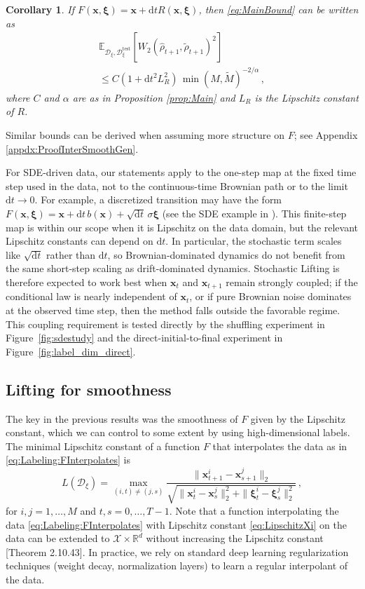 \documentclass{article}
\theoremstyle{plain}
\newtheorem{corollary}[theorem]{Corollary}
\theoremstyle{definition}
\theoremstyle{remark}
\newcommand{\bfxi}{{\bm \xi}}
\newcommand{\x}{\bm{x}}
\newcommand{\bR}{\mathbb{R}}
\newcommand{\rd}{\mathrm{d}}
\begin{document}
\begin{corollary}
  \label{corr:DTPlusL}
  If $F(\x, \bfxi) = \x + \rd t R(\x, \bfxi)$, then \eqref{eq:MainBound} can be written as
  \begin{multline}
    \mathbb E_{\mathcal{D}_{\xi}, \mathcal{D}_{\xi}^{\text{test}}} \left[ W_2( \hat{\rho}_{t + 1}, \tilde \rho_{t+1} )^2 \right] \\ \leq C ( 1 +  \rd t^2 L_R^2 ) \, {\min(M, \tilde M)}^{-2/\alpha}\,,
  \end{multline}
  where $C$ and $\alpha$ are as in Proposition \ref{prop:Main} and $L_R$ is the Lipschitz constant of $R$.
\end{corollary}
Similar bounds can be derived when assuming more structure on $F$; see Appendix \ref{appdx:ProofInterSmoothGen}.

For SDE-driven data, our statements apply to the one-step map at the fixed time step used in the data, not to the continuous-time Brownian path or to the limit $\rd t \to 0$. For example, a discretized transition may have the form $F(\x,\bfxi)=\x+\rd t\,b(\x)+\sqrt{\rd t}\,\sigma\bfxi$ (see the SDE example in ). This finite-step map is within our scope when it is Lipschitz on the data domain, but the relevant Lipschitz constants can depend on $\rd t$. In particular, the stochastic term scales like $\sqrt{\rd t}$ rather than $\rd t$, so Brownian-dominated dynamics do not benefit from the same short-step scaling as drift-dominated dynamics. Stochastic Lifting is therefore expected to work best when $\x_t$ and $\x_{t+1}$ remain strongly coupled; if the conditional law is nearly independent of $\x_t$, or if pure Brownian noise dominates at the observed time step, then the method falls outside the favorable regime. This coupling requirement is tested directly by the shuffling experiment in Figure~\ref{fig:sdestudy} and the direct-initial-to-final experiment in Figure~\ref{fig:label_dim_direct}. 

\subsection{Lifting for smoothness}
The key in the previous results was the smoothness of $F$ given by the Lipschitz constant, which we can control to some extent by using high-dimensional labels.
The minimal Lipschitz constant of a function $F$ that interpolates the data as in \eqref{eq:Labeling:FInterpolates} is
\begin{equation}
  \label{eq:LipschitzXi}
  L(\mathcal{D}_{\xi})
  =\max_{(i, t) \neq (j, s)} \frac{\| \x^i_{t+1} -\x^j_{s+1} \|_2}{ \sqrt{\| \x_t^i- \x_s^j \|_2^2 +\| \bfxi_t^i- \bfxi_s^j\|_2^2 }}\,,
\end{equation}
for $i,j = 1, \dots, M$ and $t, s = 0, \dots, T - 1$.
Note that a function interpolating the data \eqref{eq:Labeling:FInterpolates} with Lipschitz constant \eqref{eq:LipschitzXi} on the data can be extended to $\mathcal{X} \times {\bR^d}$ without increasing the Lipschitz constant \cite{Federer1996}[Theorem 2.10.43]. In practice, we rely on standard deep learning regularization techniques (weight decay, normalization layers) to learn a regular interpolant of the data.
\end{document}
